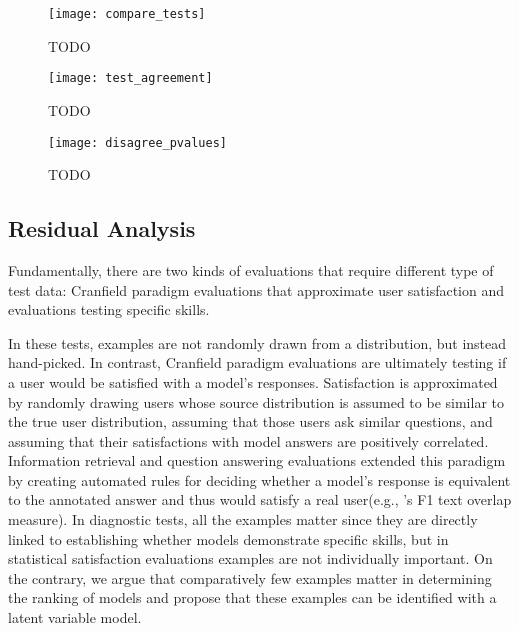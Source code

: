 \begin{figure*}[t]
    \centering
    \texttt{[image: compare\_tests]}
    \caption{
        TODO
    }
    \label{fig:compare-test}
\end{figure*}

\begin{figure}[t]
    \centering
    \texttt{[image: test\_agreement]}
    \caption{
        TODO
    }
    \label{fig:test-agree}
\end{figure}

\begin{figure}[t]
    \centering
    \texttt{[image: disagree\_pvalues]}
    \caption{
        TODO
    }
    \label{fig:disagree-dist}
\end{figure}



\subsection{Residual Analysis}

Fundamentally, there are two kinds of evaluations that require different type of test data: Cranfield paradigm evaluations that approximate user satisfaction and evaluations testing specific skills.

In these tests, examples are not randomly drawn from a distribution, but instead hand-picked.
In contrast, Cranfield paradigm evaluations are ultimately testing if a user would be satisfied with a model's responses.
Satisfaction is approximated by randomly drawing users whose source distribution is assumed to be similar to the true user distribution, assuming that those users ask similar questions, and assuming that their satisfactions with model answers are positively correlated.
Information retrieval and question answering evaluations extended this paradigm by creating automated rules for deciding whether a model's response is equivalent to the annotated answer and thus would satisfy a real user(e.g., \squad{}'s F1 text overlap measure).
In diagnostic tests, all the examples matter since they are directly linked to establishing whether models demonstrate specific skills, but in statistical satisfaction evaluations examples are not individually important.
On the contrary, we argue that comparatively few examples matter in determining the ranking of models and propose that these examples can be identified with a latent variable model.

